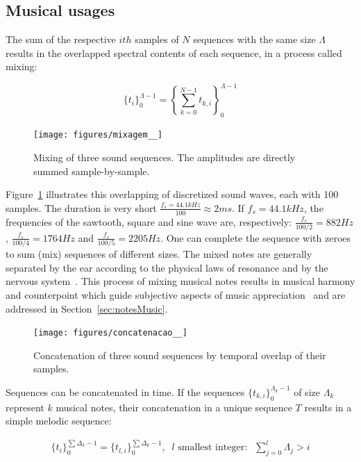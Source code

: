 \subsection{Musical usages}\label{subsec:basMus}
The sum of the respective $ith$ samples of $N$ sequences with the same size $\Lambda$
results in the overlapped spectral contents of each sequence, in a process called mixing:

\begin{equation}\label{eq:mixagem}
\{t_i\}_0^{\Lambda-1}=\left \{ \sum_{k=0}^{N-1}t_{k,i} \right \}_0^{\Lambda-1}
\end{equation}

\begin{figure}[h!]
    {\centering
        \texttt{[image: figures/mixagem\_\_]}}
    \caption{Mixing of three sound sequences. The amplitudes are directly summed sample-by-sample.}
        \label{fig:mixagem}
\end{figure}

Figure~\ref{fig:mixagem} illustrates this overlapping of discretized sound waves, each with 100 samples.
The duration is very short $\frac{f_s=44.1kHz}{100} \approx 2ms$.
If $f_s=44.1kHz$, the frequencies of the sawtooth, square and sine wave are, respectively: $\frac{f_s}{100/2}=882Hz$, $\frac{f_s}{100/4}=1764Hz$ and $\frac{f_s}{100/5}=2205Hz$.
One can complete the sequence with zeroes to sum (mix) sequences of different sizes.
The mixed notes are generally separated by the ear according to the physical laws of resonance and by the nervous system~\cite{Roederer}.
This process of mixing musical notes results in musical harmony and counterpoint which guide
subjective aspects of music appreciation~\cite{Harmonia} and are addressed in Section~\ref{sec:notesMusic}. 

\begin{figure}[h!]
{    \centering
        \texttt{[image: figures/concatenacao\_\_]}}
    \caption{Concatenation of three sound sequences by temporal overlap of their samples.}
        \label{fig:concatenacao}
\end{figure}

Sequences can be concatenated in time. If the sequences $\{t_{k,i}\}_0^{\Lambda_k-1}$ of size $\Lambda_k$ represent $k$ musical notes, their concatenation in a unique sequence $T$ results in a simple melodic sequence:

\begin{equation}\label{eq:concatenacao}
\begin{split}
\{t_i\}_0^{\sum\Delta_k-1}= \{t_{l,i}\}_0^{\sum\Delta_k-1}, \;\; l\text{ smallest integer}: \;\; \sum_{j=0}^{l}\Lambda_j > i
\end{split}
\end{equation}


